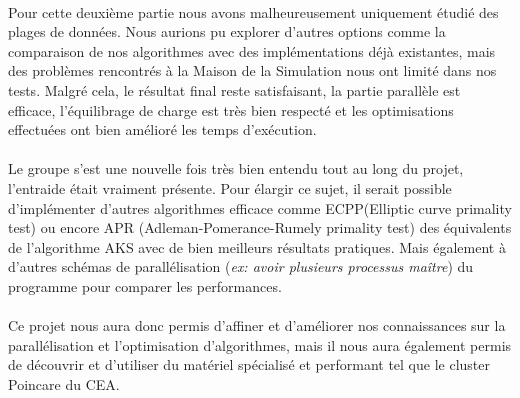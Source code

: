 	\paragraph{}Pour cette deuxième partie nous avons malheureusement uniquement étudié des plages de données. Nous aurions pu explorer d'autres options comme la comparaison de nos algorithmes avec des implémentations déjà existantes, mais des problèmes rencontrés à la Maison de la Simulation nous ont limité dans nos tests. Malgré cela, le résultat final reste satisfaisant, la partie parallèle est efficace, l'équilibrage de charge est très bien respecté et les optimisations effectuées ont bien amélioré les temps d’exécution.
	
	\paragraph{}Le groupe s'est une nouvelle fois très bien entendu tout au long du projet, l'entraide était vraiment présente. Pour élargir ce sujet, il serait possible d’implémenter d'autres algorithmes efficace comme ECPP(Elliptic curve primality test) ou encore APR (Adleman-Pomerance-Rumely primality test) des équivalents de l'algorithme AKS avec de bien meilleurs résultats pratiques. Mais également à d'autres schémas de parallélisation (\textit{ex: avoir plusieurs processus maître}) du programme pour comparer les performances.
	
	\paragraph{}Ce projet nous aura donc permis d'affiner et d'améliorer nos connaissances sur la parallélisation et l'optimisation d'algorithmes, mais il nous aura également permis de découvrir et d'utiliser du matériel spécialisé et performant tel que le cluster Poincare du CEA. 




